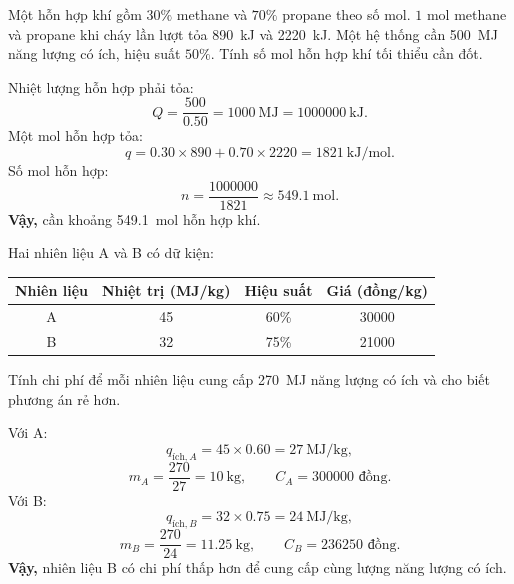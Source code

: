 \begin{tuluyen}
Một hỗn hợp khí gồm $30\%$ methane và $70\%$ propane theo số mol. $1$ mol methane và propane khi cháy lần lượt tỏa \SI{890}{\kilo\joule} và \SI{2220}{\kilo\joule}. Một hệ thống cần \SI{500}{\mega\joule} năng lượng có ích, hiệu suất $50\%$. Tính số mol hỗn hợp khí tối thiểu cần đốt.
\begin{loigiaiBT}
Nhiệt lượng hỗn hợp phải tỏa:
\[
Q=\frac{500}{0.50}=\SI{1000}{\mega\joule}=\SI{1000000}{\kilo\joule}.
\]
Một mol hỗn hợp tỏa:
\[
q=0.30\times890+0.70\times2220=\SI{1821}{\kilo\joule\per\mole}.
\]
Số mol hỗn hợp:
\[
n=\frac{1000000}{1821}\approx\SI{549.1}{\mole}.
\]
\textbf{Vậy,} cần khoảng \SI{549.1}{\mole} hỗn hợp khí.
\end{loigiaiBT}
\end{tuluyen}

\begin{tuluyen}
Hai nhiên liệu A và B có dữ kiện:
\begin{center}
\begin{tabular}{c|ccc}
\toprule
Nhiên liệu & Nhiệt trị (MJ/kg) & Hiệu suất & Giá (đồng/kg) \\
\midrule
A & 45 & 60\% & 30000 \\
B & 32 & 75\% & 21000 \\
\bottomrule
\end{tabular}
\end{center}
Tính chi phí để mỗi nhiên liệu cung cấp \SI{270}{\mega\joule} năng lượng có ích và cho biết phương án rẻ hơn.
\begin{loigiaiBT}
Với A:
\[
q_{\text{ích},A}=45\times0.60=\SI{27}{\mega\joule\per\kilo\gram},
\]
\[
m_A=\frac{270}{27}=\SI{10}{\kilo\gram},\qquad C_A=300000\text{ đồng}.
\]
Với B:
\[
q_{\text{ích},B}=32\times0.75=\SI{24}{\mega\joule\per\kilo\gram},
\]
\[
m_B=\frac{270}{24}=\SI{11.25}{\kilo\gram},\qquad C_B=236250\text{ đồng}.
\]
\textbf{Vậy,} nhiên liệu B có chi phí thấp hơn để cung cấp cùng lượng năng lượng có ích.
\end{loigiaiBT}
\end{tuluyen}

